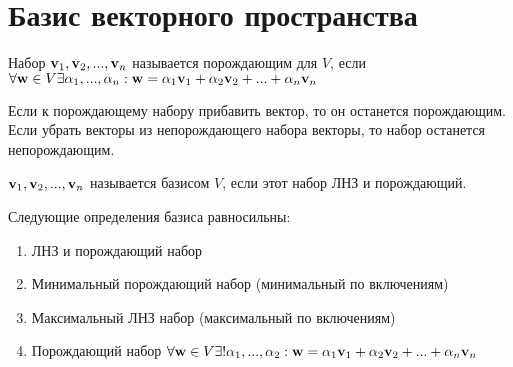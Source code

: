 \documentclass[main]{subfiles}
\begin{document}
\chapter{Базис векторного пространства}
\begin{definition}
    Набор $\mathbf{v}_1, \mathbf{v}_2, ..., \mathbf{v}_n$ называется порождающим для $V$,
    если $\forall \mathbf{w} \in V \exists \alpha_1,..., \alpha_n : \mathbf{w} =
        \alpha_1 \mathbf{v}_1 + \alpha_2 \mathbf{v}_2 + ... + \alpha_n \mathbf{v}_n$
\end{definition}
\begin{prop}
    Если к порождающему набору прибавить вектор, то он останется порождающим.
    Если убрать векторы из непорождающего набора векторы, то набор останется непорождающим.
\end{prop}

\begin{definition}
    $\mathbf{v}_1, \mathbf{v}_2, ..., \mathbf{v}_n$ называется базисом $V$, если этот набор ЛНЗ и порождающий.
\end{definition}
\begin{theorem}[О базисе]
    Следующие определения базиса равносильны:
    \begin{enumerate}
        \item ЛНЗ и  порождающий набор
        \item Минимальный порождающий набор (минимальный по включениям)
        \item Максимальный ЛНЗ набор (максимальный по включениям)
        \item Порождающий набор $\forall \mathbf{w} \in V \exists! \alpha_1, ..., \alpha_2:
                  \mathbf{w} = \alpha_1 \mathbf{v}_1 + \alpha_2 \mathbf{v}_2 + ... + \alpha_n \mathbf{v}_n$
    \end{enumerate}
\end{theorem}
\end{document}
